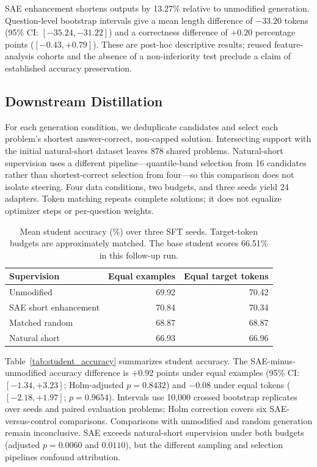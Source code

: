 SAE enhancement shortens outputs by 13.27\% relative to unmodified generation.
Question-level bootstrap intervals give a mean length difference of $-33.20$ tokens (95\% CI: $[-35.24,-31.22]$) and a correctness difference of $+0.20$ percentage points ($[-0.43,+0.79]$).
These are post-hoc descriptive results; reused feature-analysis cohorts and the absence of a non-inferiority test preclude a claim of established accuracy preservation.

\subsection{Downstream Distillation}
\label{sec:student_results}

For each generation condition, we deduplicate candidates and select each problem's shortest answer-correct, non-capped solution.
Intersecting support with the initial natural-short dataset leaves 878 shared problems.
Natural-short supervision uses a different pipeline---quantile-band selection from 16 candidates rather than shortest-correct selection from four---so this comparison does not isolate steering.
Four data conditions, two budgets, and three seeds yield 24 adapters.
Token matching repeats complete solutions; it does not equalize optimizer steps or per-question weights.

\begin{table}[htbp]
\centering
\small
\begin{tabular}{lrr}
\toprule
Supervision & Equal examples & Equal target tokens \\
\midrule
Unmodified & 69.92 & 70.42 \\
SAE short enhancement & 70.84 & 70.34 \\
Matched random & 68.87 & 68.87 \\
Natural short & 66.93 & 66.96 \\
\bottomrule
\end{tabular}
\caption{Mean student accuracy (\%) over three SFT seeds. Target-token budgets are approximately matched. The base student scores 66.51\% in this follow-up run.}
\label{tab:student_accuracy}
\label{fig:student_accuracy}
\end{table}

Table~\ref{tab:student_accuracy} summarizes student accuracy.
The SAE-minus-unmodified accuracy difference is $+0.92$ points under equal examples (95\% CI: $[-1.34,+3.23]$; Holm-adjusted $p=0.8432$) and $-0.08$ under equal tokens ($[-2.18,+1.97]$; $p=0.9654$).
Intervals use 10,000 crossed bootstrap replicates over seeds and paired evaluation problems; Holm correction covers six SAE-versus-control comparisons.
Comparisons with unmodified and random generation remain inconclusive.
SAE exceeds natural-short supervision under both budgets (adjusted $p=0.0060$ and $0.0110$), but the different sampling and selection pipelines confound attribution.

